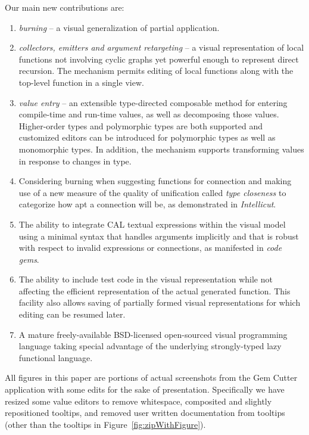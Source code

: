 \documentclass[preprint]{sigplanconf}
\begin{document}
Our main new contributions are:
\begin{enumerate}
  \item
    {\it burning} -- a visual generalization of partial application.
  \item
    {\it collectors, emitters and argument retargeting} -- a visual
    representation of local functions not involving cyclic graphs yet
    powerful enough to represent direct recursion. The mechanism
    permits editing of local functions along with the top-level
    function in a single view.
  \item
    {\it value entry} -- an extensible type-directed composable method
    for entering compile-time and run-time values, as well as
    decomposing those values. Higher-order types and polymorphic types
    are both supported and customized editors can be introduced for
    polymorphic types as well as monomorphic types. In addition, the
    mechanism supports transforming values in response to changes in
    type.
  \item
    Considering burning when suggesting functions for
    connection and making use of a new measure of the quality of unification
    called {\it type closeness} to categorize how apt a connection will be,
    as demonstrated in {\it Intellicut}.
  \item
    The ability to integrate CAL textual expressions within the visual
    model using a minimal syntax that handles arguments implicitly and
    that is robust with respect to invalid expressions or connections, as
    manifested in {\it code gems}.
  \item
    The ability to include test code in the visual representation
    while not affecting the efficient representation of the actual
    generated function. This facility also allows saving of partially
    formed visual representations for which editing can be resumed
    later.
  \item
    A mature freely-available BSD-licensed open-sourced visual
    programming language taking special advantage of the underlying
    strongly-typed lazy functional language.
\end{enumerate}

All figures in this paper are portions of actual screenshots from the
Gem Cutter application with some edits for the sake of
presentation. Specifically we have resized some
value editors to remove whitespace, composited and slightly
repositioned tooltips, and removed user written documentation from
tooltips (other than the tooltips in Figure~\ref{fig:zipWithFigure}).
\end{document}

